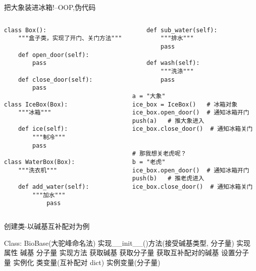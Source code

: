 \begin{frame}[fragile]{把大象装进冰箱!--OOP,伪代码}
    \begin{columns}
        \begin{lstlisting}
class Box():
    """盒子类，实现了开门、关门方法"""

    def open_door(self):
        pass

    def close_door(self):
        pass

class IceBox(Box):
    """冰箱"""

    def ice(self):
        """制冷"""
        pass

class WaterBox(Box):
    """洗衣机"""
    
    def add_water(self):
        """加水"""
            pass
        \end{lstlisting}
        \begin{lstlisting}
    def sub_water(self):
        """排水"""
        pass   

    def wash(self):
        """洗涤"""
        pass

a = "大象"
ice_box = IceBox()   # 冰箱对象
ice_box.open_door()  # 通知冰箱开门
push(a)   # 推大象进入
ice_box.close_door()  # 通知冰箱关门


# 那我想关老虎呢？
b = "老虎"
ice_box.open_door()  # 通知冰箱开门
push(b)   # 推老虎进入
ice_box.close_door()  # 通知冰箱关门
            \end{lstlisting}
    \end{columns}

\end{frame}

\begin{frame}[standout]{创建类-以碱基互补配对为例}
    \begin{myoutline}
        \1 Class: BioBase(大驼峰命名法)
        \1 实现\_\_init\_\_()方法(接受碱基类型, 分子量)
        \1 实现属性
            \2 碱基
            \2 分子量
        \1 实现方法
            \2 获取碱基
            \2 获取分子量
            \2 获取互补配对的碱基
            \2 设置分子量
        \1 实例化
        \1 类变量(互补配对 dict)
        \1 实例变量(分子量)

    \end{myoutline}
\end{frame}





 
